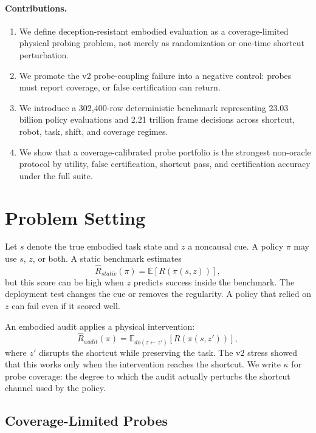 \documentclass{article}
\newcommand{\task}{s}
\newcommand{\cue}{z}
\newcommand{\policy}{\pi}
\newcommand{\coverage}{\kappa}
\begin{document}
\paragraph{Contributions.}
\begin{enumerate}[leftmargin=1.5em]
\item We define deception-resistant embodied evaluation as a coverage-limited physical probing problem, not merely as randomization or one-time shortcut perturbation.
\item We promote the v2 probe-coupling failure into a negative control: probes must report coverage, or false certification can return.
\item We introduce a 302,400-row deterministic benchmark representing 23.03 billion policy evaluations and 2.21 trillion frame decisions across shortcut, robot, task, shift, and coverage regimes.
\item We show that a coverage-calibrated probe portfolio is the strongest non-oracle protocol by utility, false certification, shortcut pass, and certification accuracy under the full suite.
\end{enumerate}

\section{Problem Setting}

Let $\task$ denote the true embodied task state and $\cue$ a noncausal cue. A policy $\policy$ may use $\task$, $\cue$, or both. A static benchmark estimates
\[
\hat{R}_{static}(\policy)=\mathbb{E}[R(\policy(\task,\cue))],
\]
but this score can be high when $\cue$ predicts success inside the benchmark. The deployment test changes the cue or removes the regularity. A policy that relied on $\cue$ can fail even if it scored well.

An embodied audit applies a physical intervention:
\[
\hat{R}_{audit}(\policy)=\mathbb{E}_{do(\cue \leftarrow \cue')}[R(\policy(\task,\cue'))],
\]
where $\cue'$ disrupts the shortcut while preserving the task. The v2 stress showed that this works only when the intervention reaches the shortcut. We write $\coverage$ for probe coverage: the degree to which the audit actually perturbs the shortcut channel used by the policy.

\subsection{Coverage-Limited Probes}
\end{document}
